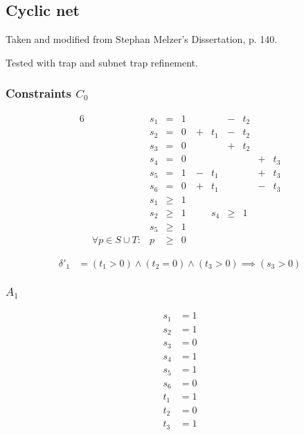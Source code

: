 \documentclass{scrartcl}
\begin{document}
\subsection{Cyclic net}

Taken and modified from Stephan Melzer's Dissertation, p. 140.

Tested with trap and subnet trap refinement.

\begin{dot2tex}[dot,options=-tmath]

\end{dot2tex}

\subsubsection{Constraints $C_0$}

\begin{alignat*}{6}
&& s_1 &{}={}&   1 &     &     &{}-{}& t_2 &     &     \\
&& s_2 &{}={}&   0 &{}+{}& t_1 &{}-{}& t_2 &     &     \\
&& s_3 &{}={}&   0 &     &     &{}+{}& t_2 &     &     \\
&& s_4 &{}={}&   0 &     &     &     &     &{}+{}& t_3 \\
&& s_5 &{}={}&   1 &{}-{}& t_1 &     &     &{}+{}& t_3 \\
&& s_6 &{}={}&   0 &{}+{}& t_1 &     &     &{}-{}& t_3 \\
&& s_1 &{}\ge{}& 1 \\
&& s_2 &{}\ge{}& 1 \
&& s_4 &{}\ge{}& 1 \\
&& s_5 &{}\ge{}& 1 \\
&\forall p \in S \cup T:& p &{}\ge{}& 0
\end{alignat*}

\begin{align*}
  \delta'_1 &= (t_1 > 0) \land (t_2 = 0) \land (t_3 > 0) \implies (s_3 > 0)
\end{align*}

\subsubsection{$A_1$}
\begin{align*}
  s_1 &= 1 \\
  s_2 &= 1 \\
  s_3 &= 0 \\
  s_4 &= 1 \\
  s_5 &= 1 \\
  s_6 &= 0 \\
  t_1 &= 1 \\
  t_2 &= 0 \\
  t_3 &= 1
\end{align*}
\end{document}

